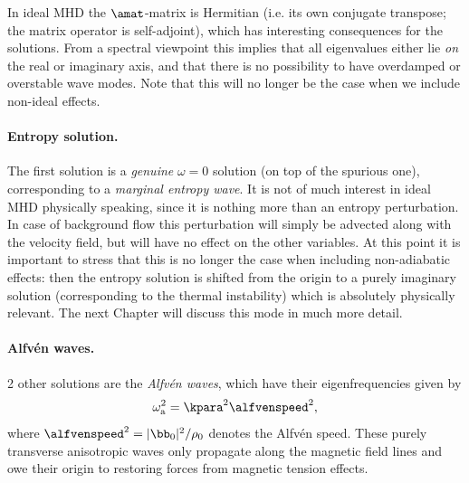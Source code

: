 In ideal MHD the $\amat$-matrix is Hermitian (\gls{i.e.} its own conjugate transpose; the matrix operator is self-adjoint), which has interesting consequences for the solutions. From a spectral viewpoint this implies that all eigenvalues either lie \emph{on} the real or imaginary axis, and that there is no possibility to have overdamped or overstable wave modes. Note that this will no longer be the case when we include non-ideal effects.

\paragraph{Entropy solution.}
The first solution is a \emph{genuine} $\omega = 0$ solution (on top of the spurious one), corresponding to a \emph{marginal entropy wave}. It is not of much interest in ideal MHD physically speaking, since it is nothing more than an entropy perturbation. In case of background flow this perturbation will simply be advected along with the velocity field, but will have no effect on the other variables. At this point it is important to stress that this is no longer the case when including non-adiabatic effects: then the entropy solution is shifted from the origin to a purely imaginary solution (corresponding to the thermal instability) which is absolutely physically relevant. The next Chapter will discuss this mode in much more detail.

\paragraph{Alfv\'en waves.}
2 other solutions are the \emph{Alfv\'en waves}, which have their eigenfrequencies given by
\begin{equation} \label{eq: alfvenwaves}
  \omega_\text{a}^2 = \kpara^2 \alfvenspeed^2,
\end{equation}
where $\alfvenspeed^2 = |\bb_0|^2 / \rho_0$ denotes the Alfv\'en speed. These purely transverse anisotropic waves only propagate along the magnetic field lines and owe their origin to restoring forces from magnetic tension effects.

